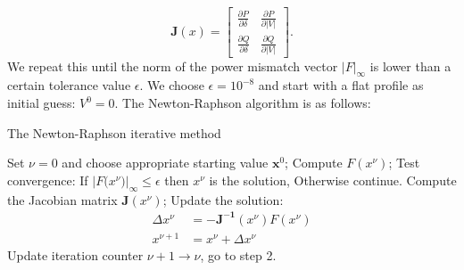 \documentclass[10pt,journal]{article}
\begin{document}
  $$\mathbf{J}({x})=\begin{bmatrix}
\frac{\partial P}{\partial\delta} & \frac{\partial P}{\partial|V|}  \\ 
\frac{\partial Q}{\partial\delta} & \frac{\partial Q}{\partial|V|} \end{bmatrix}.$$   
We repeat this until the norm of the power mismatch vector $|{F}|_{\infty}$ is lower than a certain tolerance value $\epsilon$. We choose $\epsilon=10^{-8}$ and start with a flat profile as initial guess: $V^0=0$.  
The Newton-Raphson algorithm is as follows: 
\begin{algorithm}
 \caption{The Newton-Raphson iterative method}
 \label{alg:NR}
 \begin{algorithmic}[1]
 \State Set $\nu=0$ and choose appropriate starting value $\mathbf{x}^0$;
 \State Compute ${F(x^\nu)}$;
 \State Test convergence: If $|{F}({x^\nu)}|_{\infty}\leq\epsilon$  then ${x}^\nu$ is the solution,
 Otherwise continue. 
 \State Compute the Jacobian matrix $\mathbf{J}(x^\nu)$;
 \State Update the solution: 
 \begin{equation*}
  \begin{aligned}
 {\Delta x^\nu} &= \mathbf{-J^{-1}}(x^\nu )F(x^\nu)\\
  {x^{\nu +1}} &= {x^\nu + \Delta x^\nu}
  \end{aligned}
 \end{equation*}
\State Update iteration counter $\nu+1\rightarrow \nu$, go to step 2.  
 \end{algorithmic}
\end{algorithm}{}
\end{document}
